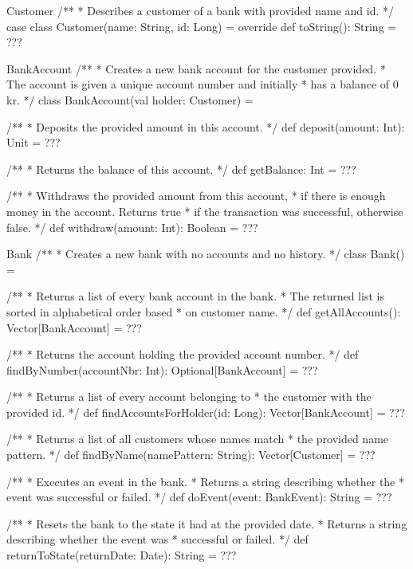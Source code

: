\begin{ScalaSpec}{Customer}
/**
 * Describes a customer of a bank with provided name and id.
 */
case class Customer(name: String, id: Long) = {
	override def toString(): String = ???
}
\end{ScalaSpec}


\begin{ScalaSpec}{BankAccount}
/**
 * Creates a new bank account for the customer provided.
 * The account is given a unique account number and initially
 * has a balance of 0 kr.
 */
class BankAccount(val holder: Customer) = {

  /**
   * Deposits the provided amount in this account.
   */
  def deposit(amount: Int): Unit = ???

  /**
   * Returns the balance of this account.
   */
  def getBalance: Int = ???

  /**
   * Withdraws the provided amount from this account,
   * if there is enough money in the account. Returns true
   * if the transaction was successful, otherwise false.
   */
  def withdraw(amount: Int): Boolean = ???
}
\end{ScalaSpec}


\begin{ScalaSpec}{Bank}
/**
 * Creates a new bank with no accounts and no history.
 */
class Bank() = {

 /**
   * Returns a list of every bank account in the bank.
   * The returned list is sorted in alphabetical order based
   * on customer name.
   */
  def getAllAccounts(): Vector[BankAccount] = ???

  /**
   * Returns the account holding the provided account number.
   */
  def findByNumber(accountNbr: Int): Optional[BankAccount] = ???

  /**
   * Returns a list of every account belonging to
   * the customer with the provided id.
   */
  def findAccountsForHolder(id: Long): Vector[BankAccount] = ???

  /**
   * Returns a list of all customers whose names match
   * the provided name pattern.
   */
  def findByName(namePattern: String): Vector[Customer] = ???

 /**
   * Executes an event in the bank.
   * Returns a string describing whether the
   * event was successful or failed.
   */
  def doEvent(event: BankEvent): String = ???

  /**
   * Resets the bank to the state it had at the provided date.
   * Returns a string describing whether the event was
   * successful or failed.
   */
  def returnToState(returnDate: Date): String = ???
}
\end{ScalaSpec}


